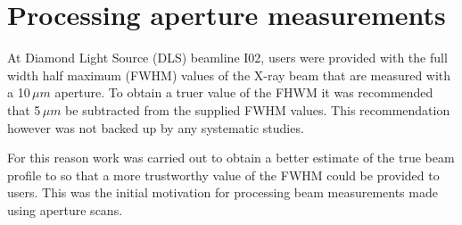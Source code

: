 \section{Processing aperture measurements}
\label{sec:Processing aperture measurements}
At Diamond Light Source (DLS) beamline I02, users were provided with the full width half maximum (FWHM) values of the X-ray beam that are measured with a 10$\,\mu m$ aperture.
To obtain a truer value of the FHWM it was recommended that 5$\,\mu m$ be subtracted from the supplied FWHM values.
This recommendation however was not backed up by any systematic studies.

For this reason work was carried out to obtain a better estimate of the true beam profile to so that a more trustworthy value of the FWHM could be provided to users.
This was the initial motivation for processing beam measurements made using aperture scans.

